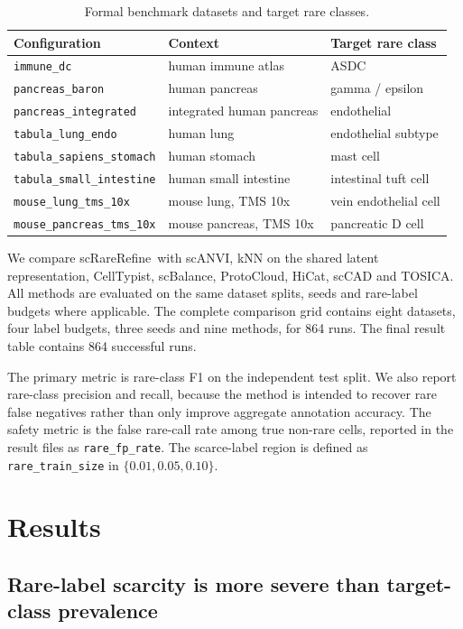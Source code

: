 \documentclass[11pt]{article}
\newcommand{\method}{scRareRefine}
\newcommand{\rts}{\texttt{rare\_train\_size}}
\begin{document}
\begin{table}[t]
\centering
\caption{Formal benchmark datasets and target rare classes.}
\label{tab:datasets}
\small
\begin{tabular}{lll}
\toprule
Configuration & Context & Target rare class \\
\midrule
\texttt{immune\_dc} & human immune atlas & ASDC \\
\texttt{pancreas\_baron} & human pancreas & gamma / epsilon \\
\texttt{pancreas\_integrated} & integrated human pancreas & endothelial \\
\texttt{tabula\_lung\_endo} & human lung & endothelial subtype \\
\texttt{tabula\_sapiens\_stomach} & human stomach & mast cell \\
\texttt{tabula\_small\_intestine} & human small intestine & intestinal tuft cell \\
\texttt{mouse\_lung\_tms\_10x} & mouse lung, TMS 10x & vein endothelial cell \\
\texttt{mouse\_pancreas\_tms\_10x} & mouse pancreas, TMS 10x & pancreatic D cell \\
\bottomrule
\end{tabular}
\end{table}

We compare \method\ with scANVI, kNN on the shared latent representation,
CellTypist, scBalance, ProtoCloud, HiCat, scCAD and TOSICA. All methods are
evaluated on the same dataset splits, seeds and rare-label budgets where
applicable. The complete comparison grid contains eight datasets, four label
budgets, three seeds and nine methods, for 864 runs. The final result table
contains 864 successful runs.

The primary metric is rare-class F1 on the independent test split. We also
report rare-class precision and recall, because the method is intended to
recover rare false negatives rather than only improve aggregate annotation
accuracy. The safety metric is the false rare-call rate among true non-rare
cells, reported in the result files as \texttt{rare\_fp\_rate}. The scarce-label
region is defined as \rts{} in $\{0.01,0.05,0.10\}$.

\section{Results}

\subsection{Rare-label scarcity is more severe than target-class prevalence}
\end{document}
